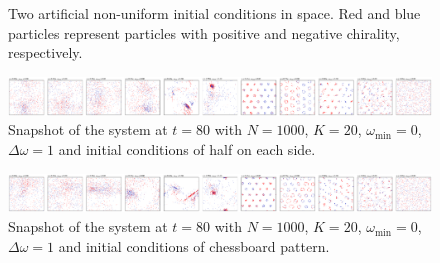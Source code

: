 \documentclass{article}
\begin{document}
\begin{figure}[H]
{    }
    \caption{
        Two artificial non-uniform initial conditions in space. Red and blue particles represent particles with positive and negative chirality, respectively. 
    }
\end{figure}

\begin{figure}[H]
    \centering
    \includegraphics[width=\textwidth]{./figs/HalfInitPhaseLagPatternFormation_a0.00_Do1_aN1000_distuniform.pdf}
    \caption{
        \label{fig:half}
        Snapshot of the system at $t=80$ with $N=1000$, $K=20$, $\omega _{\min}=0$, $\Delta \omega=1$ and initial conditions of half on each side.
    }
\end{figure}

\begin{figure}[H]
    \centering
    \includegraphics[width=\textwidth]{./figs/ChessboardPhaseLagPatternFormation_a0.00_Do1_aN1000_distuniform.pdf}
    \caption{
        \label{fig:chess}
        Snapshot of the system at $t=80$ with $N=1000$, $K=20$, $\omega _{\min}=0$, $\Delta \omega=1$ and initial conditions of chessboard pattern.
    }
\end{figure}

\newpage


\end{document}
